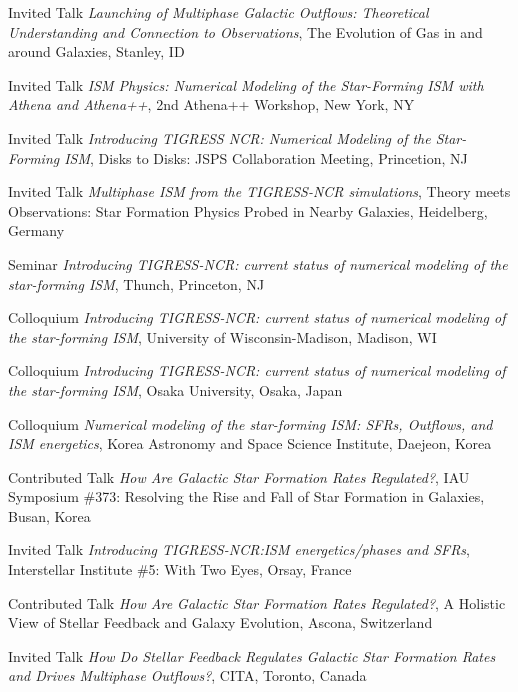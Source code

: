\documentclass[12pt]{article}
\begin{document}
{Invited Talk}
{\emph{Launching of Multiphase Galactic Outflows: Theoretical Understanding and Connection to Observations},
The Evolution of Gas in and around Galaxies,
Stanley, ID}

{Invited Talk}
{\emph{ISM Physics: Numerical Modeling of the Star-Forming ISM with Athena and Athena++},
2nd Athena++ Workshop,
New York, NY}

{Invited Talk}
{\emph{Introducing TIGRESS NCR: Numerical Modeling of the Star-Forming ISM},
Disks to Disks: JSPS Collaboration Meeting,
Princetion, NJ}

{Invited Talk}
{\emph{Multiphase ISM from the TIGRESS-NCR simulations},
Theory meets Observations: Star Formation Physics Probed in Nearby Galaxies,
Heidelberg, Germany}

{Seminar}
{\emph{Introducing TIGRESS-NCR: current status of numerical modeling of the star-forming ISM},
Thunch,
Princeton, NJ}

{Colloquium}
{\emph{Introducing TIGRESS-NCR: current status of numerical modeling of the star-forming ISM},
University of Wisconsin-Madison,
Madison, WI}

{Colloquium}
{\emph{Introducing TIGRESS-NCR: current status of numerical modeling of the star-forming ISM},
Osaka University,
Osaka, Japan}

{Colloquium}
{\emph{Numerical modeling of the star-forming ISM:  SFRs, Outflows, and ISM energetics},
Korea Astronomy and Space Science Institute,
Daejeon, Korea}

{Contributed Talk}
{\emph{How Are Galactic Star Formation Rates Regulated?},
IAU Symposium \#373: Resolving the Rise and Fall of Star Formation in Galaxies,
Busan, Korea}

{Invited Talk}
{\emph{Introducing TIGRESS-NCR:ISM energetics/phases and SFRs},
Interstellar Institute \#5: With Two Eyes,
Orsay, France}

{Contributed Talk}
{\emph{How Are Galactic Star Formation Rates Regulated?},
A Holistic View of Stellar Feedback and Galaxy Evolution,
Ascona, Switzerland}

{Invited Talk}
{\emph{How Do Stellar Feedback Regulates Galactic Star Formation Rates and Drives Multiphase Outflows?},
CITA,
Toronto, Canada}
\end{document}
